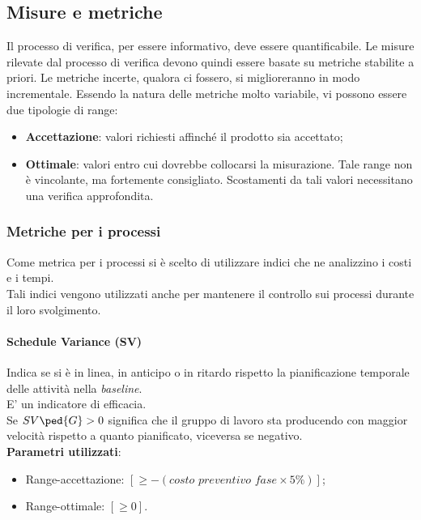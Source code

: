 \subsection{Misure e metriche}
Il processo di verifica, per essere informativo, deve essere quantificabile. Le misure rilevate dal processo di verifica devono quindi essere basate su metriche stabilite a priori. Le metriche incerte, qualora ci fossero, si miglioreranno in modo incrementale. Essendo la natura delle metriche molto variabile, vi possono essere due tipologie di range:
\begin{itemize}
\item \textbf{Accettazione}: valori richiesti affinché il prodotto sia accettato;
\item \textbf{Ottimale}: valori entro cui dovrebbe collocarsi la misurazione. Tale range non è vincolante, ma fortemente consigliato. Scostamenti da tali valori necessitano una verifica approfondita.
\end{itemize}

\subsubsection{Metriche per i processi}
Come metrica per i processi si è scelto di utilizzare indici che ne analizzino i costi e i tempi.\\
Tali indici vengono utilizzati anche per mantenere il controllo sui processi durante il loro svolgimento.

\paragraph{Schedule Variance (SV)}
Indica se si è in linea, in anticipo o in ritardo rispetto la pianificazione temporale delle attività nella \textit{baseline}.\\
E' un indicatore di efficacia.\\
Se $SV\ped{G} > 0$ significa che il gruppo di lavoro sta producendo con maggior velocità rispetto a quanto pianificato, viceversa se negativo.\\
\textbf{Parametri utilizzati}:
\begin{itemize}
\item Range-accettazione: $[\geq-(\textit{costo preventivo fase}\times5\%)]$;
\item Range-ottimale: $[\geq0]$.
\end{itemize}

